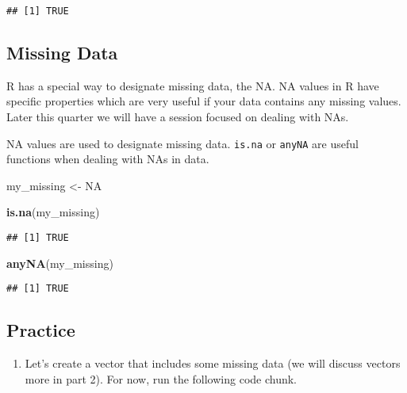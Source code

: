 \documentclass[
]{article}
\newenvironment{Shaded}{\begin{snugshade}}{\end{snugshade}}
\newcommand{\ConstantTok}[1]{\textcolor[rgb]{0.56,0.35,0.01}{#1}}
\newcommand{\FunctionTok}[1]{\textcolor[rgb]{0.13,0.29,0.53}{\textbf{#1}}}
\newcommand{\NormalTok}[1]{#1}
\newcommand{\OtherTok}[1]{\textcolor[rgb]{0.56,0.35,0.01}{#1}}
\providecommand{\tightlist}{%
  \setlength{\itemsep}{0pt}\setlength{\parskip}{0pt}}
\begin{document}
\begin{verbatim}
## [1] TRUE
\end{verbatim}

\hypertarget{missing-data}{%
\subsection{Missing Data}\label{missing-data}}

R has a special way to designate missing data, the NA. NA values in R
have specific properties which are very useful if your data contains any
missing values. Later this quarter we will have a session focused on
dealing with NAs.

NA values are used to designate missing data. \texttt{is.na} or
\texttt{anyNA} are useful functions when dealing with NAs in data.

\begin{Shaded}
\begin{Highlighting}[]
\NormalTok{my\_missing }\OtherTok{\textless{}{-}} \ConstantTok{NA}
\end{Highlighting}
\end{Shaded}

\begin{Shaded}
\begin{Highlighting}[]
\FunctionTok{is.na}\NormalTok{(my\_missing)}
\end{Highlighting}
\end{Shaded}

\begin{verbatim}
## [1] TRUE
\end{verbatim}

\begin{Shaded}
\begin{Highlighting}[]
\FunctionTok{anyNA}\NormalTok{(my\_missing)}
\end{Highlighting}
\end{Shaded}

\begin{verbatim}
## [1] TRUE
\end{verbatim}

\hypertarget{practice-1}{%
\subsection{Practice}\label{practice-1}}

\begin{enumerate}
\def\labelenumi{\arabic{enumi}.}
\tightlist
\item
  Let's create a vector that includes some missing data (we will discuss
  vectors more in part 2). For now, run the following code chunk.
\end{enumerate}
\end{document}
